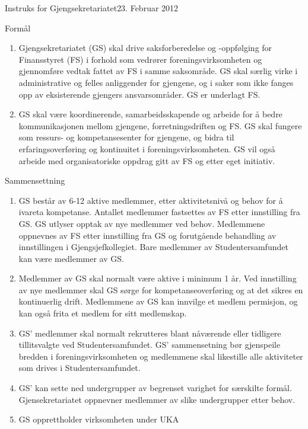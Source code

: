 \documentclass[../../fsbok.tex]{subfiles}
\begin{document}
\begin{instruks}{Instruks for Gjengsekretariatet}{23. Februar 2012}{}

    \begin{instruksledd}{Formål}
        \begin{enumerate}
            \item Gjengsekretariatet (GS) skal drive saksforberedelse og -oppfølging for Finansstyret (FS) i forhold som vedrører
foreningsvirksomheten og gjennomføre vedtak fattet av FS i samme saksområde. GS
skal særlig virke i administrative og felles anliggender for gjengene, og i saker som ikke fanges opp av
eksisterende gjengers ansvarsområder. GS er underlagt FS.
            \item  GS skal være koordinerende, samarbeidsskapende og arbeide for å bedre kommunikasjonen
mellom gjengene, forretningsdriften og FS. GS skal fungere som ressurs- og
kompetansesenter for gjengene, og bidra til erfaringsoverføring og kontinuitet i foreningsvirksomheten.
GS vil også arbeide med organisatoriske oppdrag gitt av FS og etter eget initiativ.
        \end{enumerate}
    \end{instruksledd}

    \begin{instruksledd}{Sammensettning}
        \begin{enumerate}
            \item GS består av 6-12 aktive medlemmer, etter aktivitetsnivå og behov for å ivareta kompetanse.
Antallet medlemmer fastsettes av FS etter innstilling fra GS. GS
utlyser opptak av nye medlemmer ved behov. Medlemmene oppnevnes av FS etter innstilling fra
GS og forutgående behandling av innstillingen i Gjengsjefkollegiet. Bare medlemmer av
Studentersamfundet kan være medlemmer av GS.
            \item Medlemmer av GS skal normalt være aktive i minimum 1 år. Ved innstilling av nye
medlemmer skal GS sørge for kompetanseoverføring og at det sikres en kontinuerlig drift.
Medlemmene av GS kan innvilge et medlem permisjon, og kan også frita et medlem for sitt
medlemskap.
            \item  GS' medlemmer skal normalt rekrutteres blant nåværende eller tidligere tillitsvalgte ved
Studentersamfundet. GS' sammensetning bør gjenspeile bredden i foreningsvirksomheten og
medlemmene skal likestille alle aktiviteter som drives i Studentersamfundet.
            \item GS' kan sette ned undergrupper av begrenset varighet for særskilte formål. Gjensekretariatet
oppnevner medlemmer av slike undergrupper etter behov.
            \item GS opprettholder virksomheten under UKA
        \end{enumerate}
    \end{instruksledd}


\end{instruks}
\end{document}
